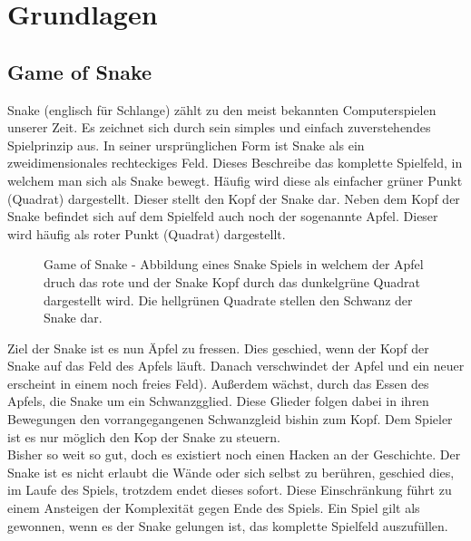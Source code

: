 
\chapter{Grundlagen}\label{sec:Grundlagen}

\section{Game of Snake}
Snake (englisch für Schlange) zählt zu den meist bekannten Computerspielen unserer Zeit. Es zeichnet sich durch sein simples und einfach zuverstehendes Spielprinzip aus.
In seiner ursprünglichen Form ist Snake als ein zweidimensionales rechteckiges Feld. Dieses Beschreibe das komplette Spielfeld, in welchem man sich als Snake bewegt. Häufig wird diese als einfacher grüner Punkt (Quadrat) dargestellt. Dieser stellt den Kopf der Snake dar. Neben dem Kopf der Snake befindet sich auf dem Spielfeld auch noch der sogenannte Apfel. Dieser wird häufig als roter Punkt (Quadrat) dargestellt.
\begin{figure}[H]
	\centering
	\def\svgscale{0.90}
	
	\caption[Game of Snake]{Game of Snake - Abbildung eines Snake Spiels in welchem der Apfel druch das rote und der Snake Kopf durch das dunkelgrüne Quadrat dargestellt wird. Die hellgrünen Quadrate stellen den Schwanz der Snake dar.}
	\label{fig:Game_of_Snake}
\end{figure}
Ziel der Snake ist es nun Äpfel zu fressen. Dies geschied, wenn der Kopf der Snake auf das Feld des Apfels läuft. Danach verschwindet der Apfel und ein neuer erscheint in einem noch freies Feld). Außerdem wächst, durch das Essen des Apfels, die Snake um ein Schwanzgglied. Diese Glieder folgen dabei in ihren Bewegungen den vorrangegangenen Schwanzgleid bishin zum Kopf. Dem Spieler ist es nur möglich den Kop der Snake zu steuern.\\
Bisher so weit so gut, doch es existiert noch einen Hacken an der Geschichte. Der Snake ist es nicht erlaubt die Wände oder sich selbst zu berühren, geschied dies, im Laufe des Spiels, trotzdem endet dieses sofort. Diese Einschränkung führt zu einem Ansteigen der Komplexität gegen Ende des Spiels. Ein Spiel gilt als gewonnen, wenn es der Snake gelungen ist, das komplette Spielfeld auszufüllen.

